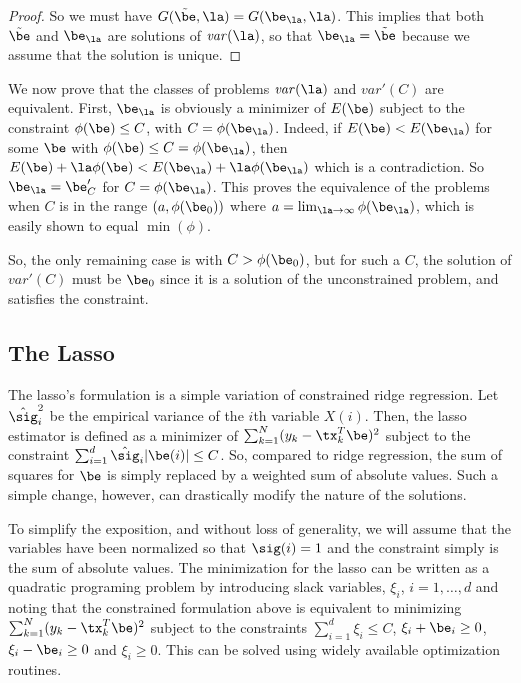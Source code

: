 \begin{proof}
So we must have $G(\tilde\be, \la) = G(\be_\la, \la)$. This implies
that both $\tilde\be$ and $\be_\la$ are solutions of
$\mathit{var}(\la)$, so that $\be_\la = \tilde \be$ because we assume
that the solution is unique. 
\end{proof}

We now prove
that the classes of problems
$\mathit{var}(\la)$ and $\mathit{var}'(C)$ are  equivalent. First,
$\be_\la$ is obviously a minimizer of $E(\be)$ subject to the
constraint $\phi(\be) \leq C$, with $C =
\phi(\be_\la)$. Indeed, if $E(\be) <E(\be_\la)$ for some $\be$ with $\phi(\be)
\leq C = \phi(\be_\la)$, then
$E(\be) + \la \phi(\be) < E(\be_\la) + \la \phi(\be_\la)$ which is a
contradiction. So $\be_\la = \be'_C$ for $C = \phi(\be_\la)$. This
proves the equivalence of the problems when $C$ is in the range $(a,
\phi(\be_0))$ where $a = \lim_{\la\to\infty} \phi(\be_\la)$, which is
easily shown to equal $\min(\phi)$. 

So, the only remaining case is with $C>
\phi(\be_0)$, but for such a $C$,  the solution of $\mathit{var}'(C)$
must be $\be_0$ since it is a solution of the unconstrained
problem, and satisfies the constraint.

\subsection{The Lasso}
The lasso's formulation is a simple variation of constrained
ridge regression. Let $\hat \sig_i^2$ be the empirical variance of the
$i$th variable $X(i)$. Then, the lasso estimator is defined as
a minimizer of
$\sum_{k=1}^N (y_k - \tx_k^T\be)^2$ subject to the constraint
$\sum_{i=1}^d \hat \sig_i|\be(i)| \leq C$. So, compared to ridge regression, the sum of squares for $\be$ is
simply replaced by a weighted sum of absolute values. Such a simple change,
however, can drastically modify the nature of the solutions.

To simplify the exposition, and without loss of generality, we will
assume that the variables have been normalized so that $\sig(i) = 1$
and the constraint simply is the sum of absolute values.
The minimization for the lasso can be written as a quadratic programing problem by introducing
slack variables, $\xi_i$, $i=1, \ldots, d$ and noting that the
constrained 
formulation above is equivalent to minimizing 
$\sum_{k=1}^N (y_k - \tx_k^T\be)^2$ subject to the constraints
$\sum_{i=1}^d\xi_i \leq C$, $\xi_i+\be_i \geq 0$, $\xi_i-\be_i\geq 0$
and $\xi_i \geq 0$. This can be solved using widely available optimization
routines. 

